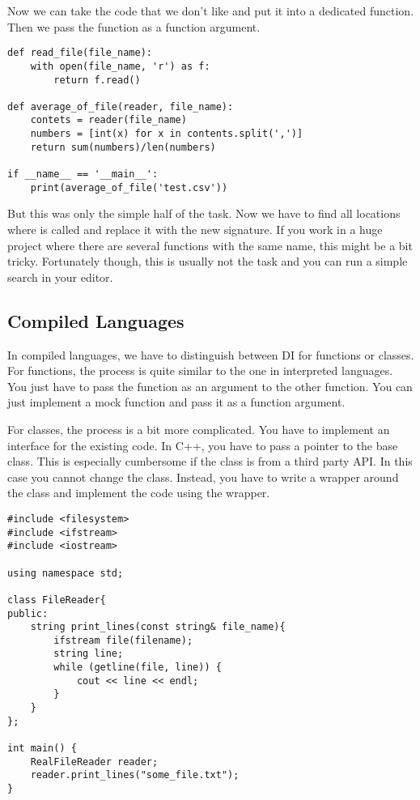 Now we can take the code that we don't like and put it into a dedicated function. Then we pass the function as a function argument.

\begin{programcode}{}
\begin{verbatim}
def read_file(file_name):
    with open(file_name, 'r') as f:
        return f.read()

def average_of_file(reader, file_name):
    contets = reader(file_name)
    numbers = [int(x) for x in contents.split(',')]
    return sum(numbers)/len(numbers)

if __name__ == '__main__':
    print(average_of_file('test.csv'))
\end{verbatim}
\end{programcode}

But this was only the simple half of the task. Now we have to find all locations where  is called and replace it with the new signature. If you work in a huge project where there are several functions with the same name, this might be a bit tricky. Fortunately though, this is usually not the task and you can run a simple search in your editor.

\subsection{Compiled Languages}

In compiled languages, we have to distinguish between DI for functions or classes. For functions, the process is quite similar to the one in interpreted languages. You just have to pass the function as an argument to the other function. You can just implement a mock function and pass it as a function argument. 

For classes, the process is a bit more complicated. You have to implement an interface for the existing code. In C++, you have to pass a pointer to the base class. This is especially cumbersome if the class is from a third party API. In this case you cannot change the class. Instead, you have to write a wrapper around the class and implement the code using the wrapper.

\begin{programcode}{}
\begin{verbatim}
#include <filesystem>
#include <ifstream>
#include <iostream>

using namespace std; 

class FileReader{
public:
    string print_lines(const string& file_name){
        ifstream file(filename);
        string line;
        while (getline(file, line)) {
            cout << line << endl;
        }
    }
};

int main() {
    RealFileReader reader;
    reader.print_lines("some_file.txt");
}
\end{verbatim}
\end{programcode}


